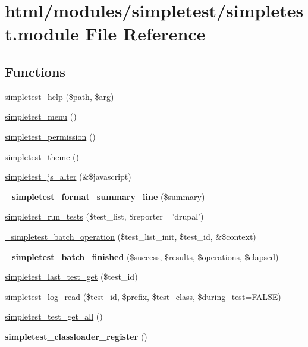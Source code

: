 \hypertarget{simpletest_8module}{
\section{html/modules/simpletest/simpletest.module File Reference}
\label{simpletest_8module}
}
\subsection*{Functions}
\begin{DoxyCompactItemize}
\item 
\hyperlink{simpletest_8module_ad5b505f2b0b217de9322d5dd81f6ea95}{simpletest\_\-help} (\$path, \$arg)
\item 
\hyperlink{simpletest_8module_a4b53dcaeb636c73dbbc1fc974daf311a}{simpletest\_\-menu} ()
\item 
\hyperlink{simpletest_8module_a48c805a2603f0f4ec321d406df350e33}{simpletest\_\-permission} ()
\item 
\hyperlink{simpletest_8module_aec0b80be4d54147c75de4ff179ce435f}{simpletest\_\-theme} ()
\item 
\hyperlink{simpletest_8module_aaa4dfc94748777a27c27d02366a7cab7}{simpletest\_\-js\_\-alter} (\&\$javascript)
\item 
\hypertarget{simpletest_8module_a0f07dd7bac7688e5b4600fd03de53e89}{
{\bfseries \_\-simpletest\_\-format\_\-summary\_\-line} (\$summary)}
\label{simpletest_8module_a0f07dd7bac7688e5b4600fd03de53e89}

\item 
\hyperlink{simpletest_8module_aa4d080c3cdac1041179452cffdaa9c39}{simpletest\_\-run\_\-tests} (\$test\_\-list, \$reporter= 'drupal')
\item 
\hyperlink{simpletest_8module_ac38fd305311e5682fd0cc00fe1111557}{\_\-simpletest\_\-batch\_\-operation} (\$test\_\-list\_\-init, \$test\_\-id, \&\$context)
\item 
\hypertarget{simpletest_8module_a51e9da23e0682fb62d73570b67c89b73}{
{\bfseries \_\-simpletest\_\-batch\_\-finished} (\$success, \$results, \$operations, \$elapsed)}
\label{simpletest_8module_a51e9da23e0682fb62d73570b67c89b73}

\item 
\hyperlink{simpletest_8module_a8b9a598940ae51908fa3a91407ce8425}{simpletest\_\-last\_\-test\_\-get} (\$test\_\-id)
\item 
\hyperlink{simpletest_8module_a5e7d71f99a71ace10b051dd720bd42d3}{simpletest\_\-log\_\-read} (\$test\_\-id, \$prefix, \$test\_\-class, \$during\_\-test=FALSE)
\item 
\hyperlink{simpletest_8module_a2d7610898fc04f0e9fa9a750d98f1513}{simpletest\_\-test\_\-get\_\-all} ()
\item 
\hypertarget{simpletest_8module_a8c8f8465512f8986c0d0bb8bf35fbd38}{
{\bfseries simpletest\_\-classloader\_\-register} ()}
\label{simpletest_8module_a8c8f8465512f8986c0d0bb8bf35fbd38}


\end{DoxyCompactItemize}
